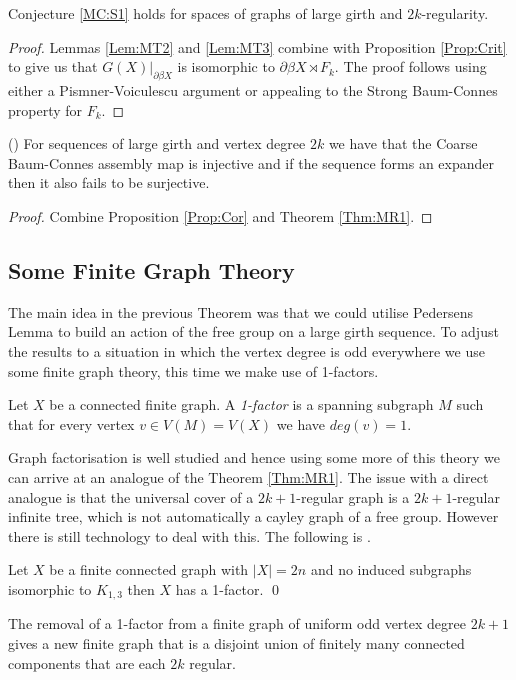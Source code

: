 \begin{theorem}\label{Thm:MR1}
Conjecture \ref{MC:S1} holds for spaces of graphs of large girth and $2k$-regularity.
\end{theorem}
\begin{proof}
Lemmas \ref{Lem:MT2} and \ref{Lem:MT3} combine with Proposition \ref{Prop:Crit} to give us that $G(X)|_{\partial \beta X}$ is isomorphic to $\partial \beta X \rtimes F_{k}$. The proof follows using either a Pismner-Voiculescu argument or appealing to the Strong Baum-Connes property for $F_{k}$.
\end{proof}

\begin{corollary}(\cite[Theorem 1.5]{explg1})
For sequences of large girth and vertex degree $2k$ we have that the Coarse Baum-Connes assembly map is injective and if the sequence forms an expander then it also fails to be surjective.
\end{corollary}
\begin{proof}
Combine Proposition \ref{Prop:Cor} and Theorem \ref{Thm:MR1}.
\end{proof}

\subsection{Some Finite Graph Theory}
The main idea in the previous Theorem was that we could utilise Pedersens Lemma to build an action of the free group on a large girth sequence. To adjust the results to a situation in which the vertex degree is odd everywhere we use some finite graph theory, this time we make use of 1-factors.

\begin{definition}
Let $X$ be a connected finite graph. A \textit{1-factor} is a spanning subgraph $M$ such that for every vertex $v \in V(M)=V(X)$ we have $deg(v)=1$.
\end{definition}

Graph factorisation is well studied \cite{MR785648} and hence using some more of this theory we can arrive at an analogue of the Theorem \ref{Thm:MR1}. The issue with a direct analogue is that the universal cover of a $2k+1$-regular graph is a $2k+1$-regular infinite tree, which is not automatically a cayley graph of a free group. However there is still technology to deal with this. The following is \cite[Corollary 2]{MR0323648}.

\begin{proposition}
Let $X$ be a finite connected graph with $\vert X \vert = 2n$ and no induced subgraphs isomorphic to $K_{1,3}$ then $X$ has a 1-factor. \qed
\end{proposition}
The removal of a 1-factor from a finite graph of uniform odd vertex degree $2k+1$ gives a new finite graph that is a disjoint union of finitely many connected components that are each $2k$ regular.

